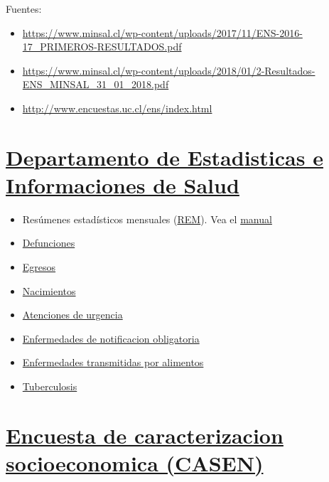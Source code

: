 \documentclass[]{book}
\providecommand{\tightlist}{%
  \setlength{\itemsep}{0pt}\setlength{\parskip}{0pt}}
\begin{document}
Fuentes:

\begin{itemize}
\tightlist
\item
  \url{https://www.minsal.cl/wp-content/uploads/2017/11/ENS-2016-17_PRIMEROS-RESULTADOS.pdf}
\item
  \url{https://www.minsal.cl/wp-content/uploads/2018/01/2-Resultados-ENS_MINSAL_31_01_2018.pdf}
\item
  \url{http://www.encuestas.uc.cl/ens/index.html}
\end{itemize}

\hypertarget{departamento-de-estadisticas-e-informaciones-de-salud}{%
\section{\texorpdfstring{\href{http://www.deis.cl/}{Departamento de Estadisticas e Informaciones de Salud}}{Departamento de Estadisticas e Informaciones de Salud}}\label{departamento-de-estadisticas-e-informaciones-de-salud}}

\begin{itemize}
\tightlist
\item
  Resúmenes estadísticos mensuales (\href{http://www.deis.cl/bases-de-datos-rem/}{REM}). Vea el \href{http://estadisticas.ssosorno.cl/estadisticas/2017/manuales/2017-2018-Manual-Series-REM-V1.1.pdf}{manual}
\item
  \href{http://www.deis.cl/bases-de-datos-defunciones/}{Defunciones}
\item
  \href{http://www.deis.cl/descargar-bases-de-datos-2/?page_id=3487}{Egresos}
\item
  \href{http://www.deis.cl/descargar-bases-de-datos-2/?page_id=3493}{Nacimientos}
\item
  \href{http://www.deis.cl/descargar-bases-de-datos-2/?page_id=3499}{Atenciones de urgencia}
\item
  \href{http://www.deis.cl/descargar-bases-de-datos-2/?page_id=3784}{Enfermedades de notificacion obligatoria}
\item
  \href{http://www.deis.cl/estadisticas-eta/}{Enfermedades transmitidas por alimentos}
\item
  \href{http://www.deis.cl/?page_id=3946}{Tuberculosis}
\end{itemize}

\hypertarget{encuesta-de-caracterizacion-socioeconomica-casen}{%
\section{\texorpdfstring{\href{http://observatorio.ministeriodesarrollosocial.gob.cl/casen-multidimensional/casen/casen_2017.php}{Encuesta de caracterizacion socioeconomica (CASEN)}}{Encuesta de caracterizacion socioeconomica (CASEN)}}\label{encuesta-de-caracterizacion-socioeconomica-casen}}
\end{document}

